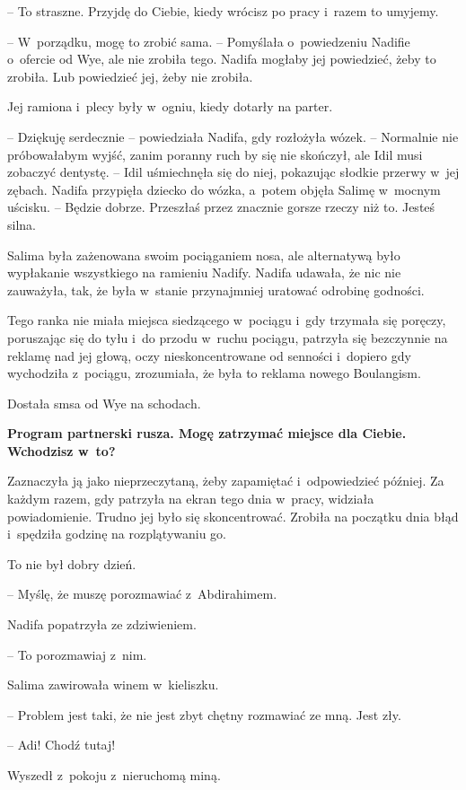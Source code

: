 \documentclass[oneside,polish,11pt,sfheadings]{mwbk}
\begin{document}
-- To straszne. Przyjdę do Ciebie, kiedy wrócisz po pracy i~razem to
umyjemy.

-- W~porządku, mogę to zrobić sama. -- Pomyślała o~powiedzeniu Nadifie o~ofercie od Wye, ale nie zrobiła tego. Nadifa mogłaby jej powiedzieć,
żeby to zrobiła. Lub powiedzieć jej, żeby nie zrobiła.

Jej ramiona i~plecy były w~ogniu, kiedy dotarły na parter.

-- Dziękuję serdecznie -- powiedziała Nadifa, gdy rozłożyła wózek. -- Normalnie nie próbowałabym wyjść, zanim poranny ruch by się nie
skończył, ale Idil musi zobaczyć dentystę. -- Idil uśmiechnęła się do
niej, pokazując słodkie przerwy w~jej zębach. Nadifa przypięła dziecko
do wózka, a~potem objęła Salimę w~mocnym uścisku. -- Będzie dobrze.
Przeszłaś przez znacznie gorsze rzeczy niż to. Jesteś silna.

Salima była zażenowana swoim pociąganiem nosa, ale alternatywą było
wypłakanie wszystkiego na ramieniu Nadify. Nadifa udawała, że nic nie
zauważyła, tak, że była w~stanie przynajmniej uratować odrobinę
godności.

Tego ranka nie miała miejsca siedzącego w~pociągu i~gdy trzymała się
poręczy, poruszając się do tyłu i~do przodu w~ruchu pociągu, patrzyła
się bezczynnie na reklamę nad jej głową, oczy nieskoncentrowane od
senności i~dopiero gdy wychodziła z~pociągu, zrozumiała, że była to
reklama nowego Boulangism.

Dostała smsa od Wye na schodach.

\textbf{ Program partnerski rusza. Mogę zatrzymać miejsce
dla Ciebie. Wchodzisz w~to?}

Zaznaczyła ją jako nieprzeczytaną, żeby zapamiętać i~odpowiedzieć
później. Za każdym razem, gdy patrzyła na ekran tego dnia w~pracy,
widziała powiadomienie. Trudno jej było się skoncentrować. Zrobiła na
początku dnia błąd i~spędziła godzinę na rozplątywaniu go.

To nie był dobry dzień.

-- Myślę, że muszę porozmawiać z~Abdirahimem.

Nadifa popatrzyła ze zdziwieniem. 

-- To porozmawiaj z~nim.

Salima zawirowała winem w~kieliszku. 

-- Problem jest taki, że nie jest
zbyt chętny rozmawiać ze mną. Jest zły.

-- Adi! Chodź tutaj!

Wyszedł z~pokoju z~nieruchomą miną. 
\end{document}
